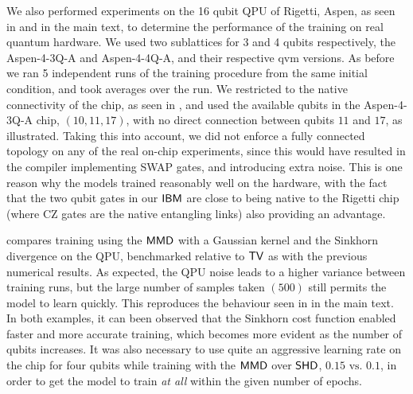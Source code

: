 We also performed experiments on the 16 qubit QPU of Rigetti, {\selectfont Aspen}, as seen in  and  in the main text, to determine the performance of the training on real quantum hardware. We used two sublattices for 3 and 4 qubits respectively, the {\selectfont Aspen-4-3Q-A} and {\selectfont Aspen-4-4Q-A}, and their respective {\selectfont qvm} versions. As before we ran 5 independent runs of the training procedure from the same initial condition, and took averages over the run. We restricted to the native connectivity of the chip, as seen in , and used the available qubits in the {\selectfont Aspen-4-3Q-A} chip, $(10, 11, 17)$, with no direct connection between qubits $11$ and $17$, as illustrated. Taking this into account, we did not enforce a fully connected topology on any of the real on-chip experiments, since this would have resulted in the compiler implementing SWAP gates, and introducing extra noise. This is one reason why the models trained reasonably well on the hardware, with the fact that the two qubit gates in our $\textsf{IBM}$ are close to being native to the Rigetti chip (where CZ gates are the native entangling links) also providing an advantage.

 compares training using the $\operatorname{\textsf{MMD}}$ with a Gaussian kernel and the Sinkhorn divergence on the QPU, benchmarked relative to $\operatorname{\textsf{TV}}$ as with the previous numerical results. As expected, the QPU noise leads to a higher variance between training runs, but the large number of samples taken $(500)$ still permits the model to learn quickly. This reproduces the behaviour seen in  in the main text. In both examples, it can been observed that the Sinkhorn cost function enabled faster and more accurate training, which becomes more evident as the number of qubits increases. It was also necessary to use quite an aggressive learning rate on the chip for four qubits while training with the $\operatorname{\textsf{MMD}}$ over $\operatorname{\textsf{SHD}}$, $0.15 \text{ vs. } 0.1$, in order to get the model to train \textit{at all} within the given number of epochs. 


